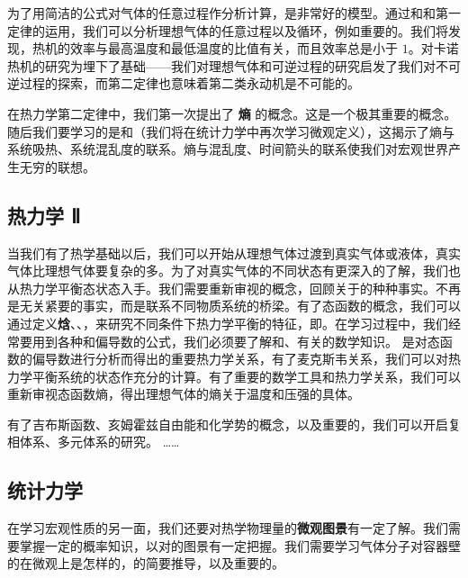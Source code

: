 为了用简洁的公式对气体的任意过程作分析计算，是非常好的模型。通过和和第一定律的运用，我们可以分析理想气体的任意过程以及循环，例如重要的。我们将发现，热机的效率与最高温度和最低温度的比值有关，而且效率总是小于 $1$。对卡诺热机的研究为埋下了基础——我们对理想气体和可逆过程的研究启发了我们对不可逆过程的探索，而第二定律也意味着第二类永动机是不可能的。

在热力学第二定律中，我们第一次提出了 \textbf{熵} 的概念。这是一个极其重要的概念。随后我们要学习的是和（我们将在统计力学中再次学习微观定义），这揭示了熵与系统吸热、系统混乱度的联系。熵与混乱度、时间箭头的联系使我们对宏观世界产生无穷的联想。

\subsection{热力学 Ⅱ}

当我们有了热学基础以后，我们可以开始从理想气体过渡到真实气体或液体，真实气体比理想气体要复杂的多。为了对真实气体的不同状态有更深入的了解，我们也从热力学平衡态状态入手。我们需要重新审视的概念，回顾关于的种种事实。不再是无关紧要的事实，而是联系不同物质系统的桥梁。有了态函数的概念，我们可以通过定义\textbf{焓}、、，来研究不同条件下热力学平衡的特征，即。在学习过程中，我们经常要用到各种和偏导数的公式，我们必须要了解和、有关的数学知识。 是对态函数的偏导数进行分析而得出的重要热力学关系，有了麦克斯韦关系，我们可以对热力学平衡系统的状态作充分的计算。有了重要的数学工具和热力学关系，我们可以重新审视态函数熵，得出理想气体的熵关于温度和压强的具体。

有了吉布斯函数、亥姆霍兹自由能和化学势的概念，以及重要的，我们可以开启复相体系、多元体系的研究。
……


\subsection{统计力学}

在学习宏观性质的另一面，我们还要对热学物理量的\textbf{微观图景}有一定了解。我们需要掌握一定的概率知识，以对的图景有一定把握。我们需要学习气体分子对容器壁的在微观上是怎样的，的简要推导，以及重要的。

